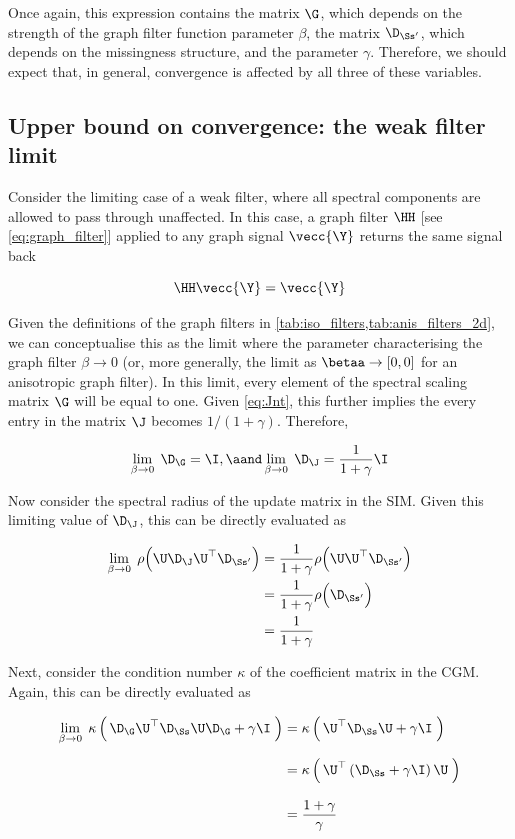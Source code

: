 Once again, this expression contains the matrix $\G$, which depends on the strength of the graph filter function parameter $\beta$, the matrix $\D_{\Ss'}$, which depends on the missingness structure, and the parameter $\gamma$. Therefore, we should expect that, in general, convergence is affected by all three of these variables. 


\subsection{Upper bound on convergence: the weak filter limit}

Consider the limiting case of a weak filter, where all spectral components are allowed to pass through unaffected. In this case, a graph filter $\HH$ [see \cref{eq:graph_filter}] applied to any graph signal $\vecc{\Y}$ returns the same signal back 

$$
\HH \vecc{\Y} = \vecc{\Y}
$$

Given the definitions of the graph filters in \cref{tab:iso_filters,tab:anis_filters_2d}, we can conceptualise this as the limit where the parameter characterising the graph filter $\beta \rightarrow 0$ (or, more generally, the limit as $\betaa \rightarrow [0, 0]$ for an anisotropic graph filter). In this limit, every element of the spectral scaling matrix $\G$ will be equal to one. Given \cref{eq:Jnt}, this further implies the every entry in the matrix $\J$ becomes $1 / (1 + \gamma)$. Therefore, 

$$
\lim_{\beta \rightarrow 0} \; \D_\G = \I, \aand \lim_{\beta \rightarrow 0} \; \D_\J = \frac{1}{1 + \gamma} \I
$$

Now consider the spectral radius of the update matrix in the SIM. Given this limiting value of $\D_\J$, this can be directly evaluated as

\begin{align}
    \lim_{\beta \rightarrow 0} \; \rho\Big(\U \D_\J \U^\top \D_{\Ss'} \Big) &= \frac{1}{1 + \gamma} \rho\Big(\U \U^\top \D_{\Ss'} \Big) \notag \\
    &= \frac{1}{1 + \gamma} \rho\Big(\D_{\Ss'} \Big) \notag \\
    &= \frac{1}{1 + \gamma} \label{eq:beta_lim_0} 
\end{align}

Next, consider the condition number $\kappa$ of the coefficient matrix in the CGM. Again, this can be directly evaluated as 


\begin{align}
    \lim_{\beta \rightarrow 0} \; \kappa \left(  \, \D_\G \U^\top \D_{\Ss} \U \D_\G + \gamma \I \; \right) &= \kappa  \left(  \, \U^\top \D_{\Ss} \U + \gamma \I \; \right) \notag \\[0.2cm]
    &= \kappa  \left(  \, \U^\top \left( \D_{\Ss} + \gamma \I \right) \U \; \right) \notag \\[0.3cm]
    &= \frac{1 + \gamma}{\gamma}
\end{align}

